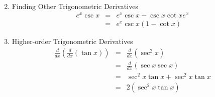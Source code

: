 \documentclass{article}
\begin{document}
\begin{enumerate}
\begin{eqnarray}
    \end{eqnarray}
    \item Finding Other Trigonometric Derivatives
    \begin{eqnarray}
        e^x \csc{x} &=& e^x\csc{x} - \csc{x}\cot{x}e^x \\
                    &=& e^x\csc{x}(1 - \cot{x})
    \end{eqnarray}
    \item Higher-order Trigonometric Derivatives
    \begin{eqnarray}
        \frac{d}{dx} \left(\frac{d}{dx} \left(\tan{x}\right)\right) &=& \frac{d}{dx} \left(\sec^2{x}\right) \\
                                                                    &=& \frac{d}{dx} \left(\sec{x}\sec{x}\right) \\
                                                                    &=& \sec^2{x}\tan{x} + \sec^2{x}\tan{x} \\
                                                                    &=& 2\left(\sec^2{x}\tan{x}\right)
    \end{eqnarray}
\end{enumerate}
\end{document}
